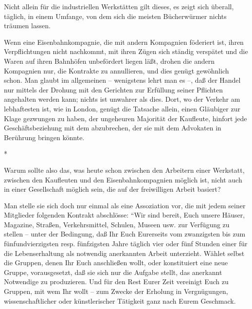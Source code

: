 \documentclass{scrbook}
\begin{document}
Nicht allein für die industriellen Werkstätten gilt dieses, es zeigt sich überall, täglich, in einem Umfange, von dem sich die meisten Bücherwürmer nichts träumen lassen.

Wenn eine Eisenbahnkompagnie, die mit andern Kompagnien föderiert ist, ihren Verpflichtungen nicht nachkommt, mit ihren Zügen sich ständig verspätet und die Waren auf ihren Bahnhöfen unbefördert liegen läßt, drohen die andern Kompagnien nur, die Kontrakte zu annullieren, und dies genügt gewöhnlich schon. Man glaubt im allgemeinen – wenigstens lehrt man es –, daß der Handel nur mittels der Drohung mit den Gerichten zur Erfüllung seiner Pflichten angehalten werden kann; nichts ist unwahrer als dies. Dort, wo der Verkehr am lebhaftesten ist, wie in London, genügt die Tatsache allein, einen Gläubiger zur Klage gezwungen zu haben, der ungeheuren Majorität der Kaufleute, hinfort jede Geschäftsbeziehung mit dem abzubrechen, der sie mit dem Advokaten in Berührung bringen könnte.

\begin{center}*\end{center}

Warum sollte also das, was heute schon zwischen den Arbeitern einer Werkstatt, zwischen den Kaufleuten und den Eisenbahnkompagnien möglich ist, nicht auch in einer Gesellschaft möglich sein, die auf der freiwilligen Arbeit basiert?

Man stelle sie sich doch nur einmal als eine Assoziation vor, die mit jedem seiner Mitglieder folgenden Kontrakt abschlösse: ``Wir sind bereit, Euch unsere Häuser, Magazine, Straßen, Verkehrsmittel, Schulen, Museen usw. zur Verfügung zu stellen – unter der Bedingung, daß Ihr Euch Eurerseits vom zwanzigsten bis zum fünfundvierzigsten resp. fünfzigsten Jahre täglich vier oder fünf Stunden einer für die Lebenserhaltung als notwendig anerkannten Arbeit unterzieht. Wählet selbst die Gruppen, denen Ihr Euch anschließen wollt, oder konstituiert eine neue Gruppe, vorausgesetzt, daß sie sich nur die Aufgabe stellt, das anerkannt Notwendige zu produzieren. Und für den Rest Eurer Zeit vereinigt Euch zu Gruppen, mit wem Ihr wollt – zum Zwecke der Erholung in Vergnügungen, wissenschaftlicher oder künstlerischer Tätigkeit ganz nach Eurem Geschmack.
\end{document}
